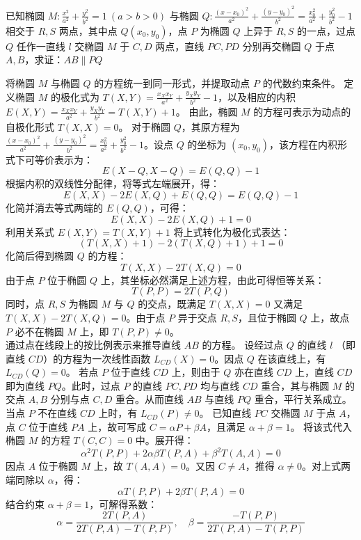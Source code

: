 \begin{example}
已知椭圆 \(M: \frac{x^2}{a^2} + \frac{y^2}{b^2} = 1\ (a>b>0)\) 与椭圆 \(Q: \frac{(x-x_0)^2}{a^2} + \frac{(y-y_0)^2}{b^2} = \frac{x_0^2}{a^2} + \frac{y_0^2}{b^2} - 1\) 相交于 \(R,S\) 两点，其中点 \(Q(x_0,y_0)\)，点 \(P\) 为椭圆 \(Q\) 上异于 \(R,S\) 的一点，过点 \(Q\) 任作一直线 \(l\) 交椭圆 \(M\) 于 \(C,D\) 两点，直线 \(PC,PD\) 分别再交椭圆 \(Q\) 于点 \(A,B\)，求证：\(AB \parallel PQ\)
\end{example}
\begin{solution}
将椭圆 $M$ 与椭圆 $Q$ 的方程统一到同一形式，并提取动点 $P$ 的代数约束条件。
定义椭圆 $M$ 的极化式为 $T(X,Y) = \frac{x_X x_Y}{a^2} + \frac{y_X y_Y}{b^2} - 1$，以及相应的内积 $E(X,Y) = \frac{x_X x_Y}{a^2} + \frac{y_X y_Y}{b^2} = T(X,Y) + 1$。
由此，椭圆 $M$ 的方程可表示为动点的自极化形式 $T(X,X) = 0$。
对于椭圆 $Q$，其原方程为 $\frac{(x-x_0)^2}{a^2} + \frac{(y-y_0)^2}{b^2} = \frac{x_0^2}{a^2} + \frac{y_0^2}{b^2} - 1$。设点 $Q$ 的坐标为 $(x_0, y_0)$，该方程在内积形式下可等价表示为：
\[ E(X-Q, X-Q) = E(Q,Q) - 1 \]
根据内积的双线性分配律，将等式左端展开，得：
\[ E(X,X) - 2E(X,Q) + E(Q,Q) = E(Q,Q) - 1 \]
化简并消去等式两端的 $E(Q,Q)$，可得：
\[ E(X,X) - 2E(X,Q) + 1 = 0 \]
利用关系式 $E(X,Y) = T(X,Y) + 1$ 将上式转化为极化式表达：
\[ (T(X,X) + 1) - 2(T(X,Q) + 1) + 1 = 0 \]
化简后得到椭圆 $Q$ 的方程：
\[ T(X,X) - 2T(X,Q) = 0 \]
由于点 $P$ 位于椭圆 $Q$ 上，其坐标必然满足上述方程，由此可得恒等关系：
\[ T(P,P) = 2T(P,Q) \]
同时，点 $R, S$ 为椭圆 $M$ 与 $Q$ 的交点，既满足 $T(X,X)=0$ 又满足 $T(X,X)-2T(X,Q)=0$。由于点 $P$ 异于交点 $R, S$，且位于椭圆 $Q$ 上，故点 $P$ 必不在椭圆 $M$ 上，即 $T(P,P) \neq 0$。\\
通过点在线段上的按比例表示来推导直线 $AB$ 的方程。
设经过点 $Q$ 的直线 $l$ （即直线 $CD$）的方程为一次线性函数 $L_{CD}(X) = 0$。因点 $Q$ 在该直线上，有 $L_{CD}(Q) = 0$。
若点 $P$ 位于直线 $CD$ 上，则由于 $Q$ 亦在直线 $CD$ 上，直线 $CD$ 即为直线 $PQ$。此时，过点 $P$ 的直线 $PC, PD$ 均与直线 $CD$ 重合，其与椭圆 $M$ 的交点 $A, B$ 分别与点 $C, D$ 重合。从而直线 $AB$ 与直线 $PQ$ 重合，平行关系成立。
当点 $P$ 不在直线 $CD$ 上时，有 $L_{CD}(P) \neq 0$。
已知直线 $PC$ 交椭圆 $M$ 于点 $A$，点 $C$ 位于直线 $PA$ 上，故可写成 $C = \alpha P + \beta A$，且满足 $\alpha + \beta = 1$。
将该式代入椭圆 $M$ 的方程 $T(C,C) = 0$ 中。展开得：
\[ \alpha^2 T(P,P) + 2\alpha\beta T(P,A) + \beta^2 T(A,A) = 0 \]
因点 $A$ 位于椭圆 $M$ 上，故 $T(A,A) = 0$。又因 $C \neq A$，推得 $\alpha \neq 0$。对上式两端同除以 $\alpha$，得：
\[ \alpha T(P,P) + 2\beta T(P,A) = 0 \]
结合约束 $\alpha + \beta = 1$，可解得系数：
\[ \alpha = \frac{2T(P,A)}{2T(P,A) - T(P,P)}, \quad \beta = \frac{-T(P,P)}{2T(P,A) - T(P,P)} \]

\end{solution}
